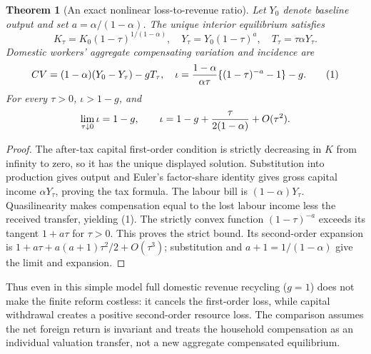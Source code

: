\documentclass[11pt]{article}
\newtheorem{theorem}{Theorem}
\theoremstyle{definition}
\begin{document}
\begin{theorem}[An exact nonlinear loss-to-revenue ratio]
Let $Y_0$ denote baseline output and set $a=\alpha/(1-\alpha)$.
The unique interior equilibrium satisfies
\[
 K_\tau=K_0(1-\tau)^{1/(1-\alpha)},\quad
 Y_\tau=Y_0(1-\tau)^a,\quad
 T_\tau=\tau\alpha Y_\tau.
\]
Domestic workers' aggregate compensating variation and incidence are
\[
 CV=(1-\alpha)(Y_0-Y_\tau)-gT_\tau,
\quad
 \iota={1-\alpha\over\alpha\tau}
          \{(1-\tau)^{-a}-1\}-g. \tag{1}
\]
For every $\tau>0$, $\iota>1-g$, and
\[
 \lim_{\tau\downarrow0}\iota=1-g,\qquad
 \iota=1-g+{\tau\over2(1-\alpha)}+O(\tau^2).
\]
\end{theorem}
\begin{proof}
The after-tax capital first-order condition is strictly decreasing in $K$
from infinity to zero, so it has the unique displayed solution. Substitution
into production gives output and Euler's factor-share identity gives gross
capital income $\alpha Y_\tau$, proving the tax formula. The labour bill is
$(1-\alpha)Y_\tau$. Quasilinearity makes compensation equal to the lost
labour income less the received transfer, yielding (1).
The strictly convex function $(1-\tau)^{-a}$ exceeds its tangent $1+a\tau$
for $\tau>0$. This proves the strict bound. Its second-order expansion is
$1+a\tau+a(a+1)\tau^2/2+O(\tau^3)$; substitution and
$a+1=1/(1-\alpha)$ give the limit and expansion.
\end{proof}

Thus even in this simple model full domestic revenue recycling ($g=1$)
does not make the finite reform costless: it cancels the first-order loss,
while capital withdrawal creates a positive second-order resource loss.
The comparison assumes the net foreign return is invariant and treats the
household compensation as an individual valuation transfer, not a new
aggregate compensated equilibrium.
\end{document}
